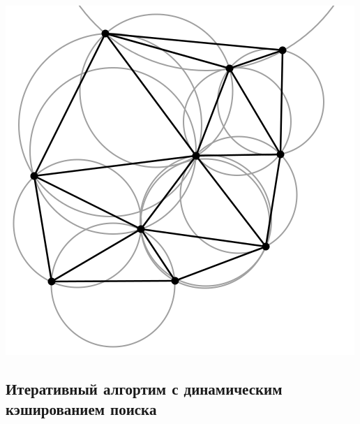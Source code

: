 \documentclass[a4paper, 12pt]{article}   	%
\begin{document}
    \begin{center}
        \begin{minipage}{0.5\linewidth}
            \includegraphics[width=\linewidth]{img/triangulation_delone}
        \end{minipage}
    \end{center}

\newpage

\subsection{Итеративный алгортим с динамическим кэшированием поиска}
\end{document}

